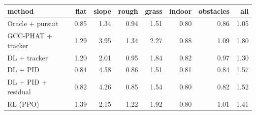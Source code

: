 \begin{tabular}{lrrrrrrr}
\toprule
method & flat & slope & rough & grass & indoor & obstacles & all\\
\midrule
Oracle + pursuit & 0.85 & 1.34 & 0.94 & 1.51 & 0.80 & 0.86 & 1.05 \\
GCC-PHAT + tracker & 1.29 & 3.95 & 1.34 & 2.27 & 0.88 & 1.09 & 1.80 \\
DL + tracker & 1.20 & 2.01 & 0.95 & 1.84 & 0.82 & 0.97 & 1.30 \\
DL + PID & 0.84 & 4.58 & 0.86 & 1.51 & 0.81 & 0.84 & 1.57 \\
DL + PID + residual & 0.82 & 4.26 & 0.85 & 1.54 & 0.80 & 0.82 & 1.52 \\
RL (PPO) & 1.39 & 2.15 & 1.22 & 1.92 & 0.80 & 1.01 & 1.41 \\
\bottomrule
\end{tabular}
